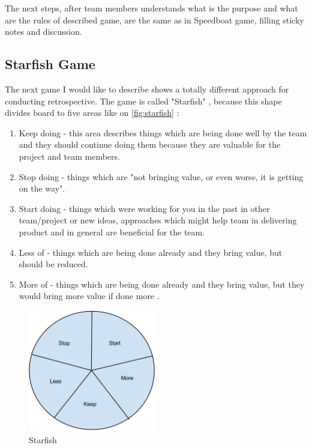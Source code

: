 The next steps, after team members understands what is the purpose and what are the rules of described game, are the same as in Speedboat game, filling sticky notes and discussion.

\subsection{Starfish Game}
\label{subch:starfishGame}
The next game I would like to describe shows a totally different approach for conducting retrospective. The game is called "Starfish" \cite{StarfishBibliography}, because this shape divides board to five areas like on \autoref{fig:starfish} :
\begin{enumerate}
    \item Keep doing - this area describes things which are being done well by the team and they should continue doing them because they are valuable for the project and team members.
    \item Stop doing - things which are "not bringing value, or even worse, it is getting on the way"\cite{StarfishBibliography}.
    \item Start doing - things which were working for you in the past in other team/project or new ideas, approaches which might help team in delivering product and in general are beneficial for the team.
    \item Less of - things which are being done already and they bring value, but should be reduced.
    \item More of - things which are being done already and they bring value, but they would bring more value if done more \cite{StarfishBibliography}.
\end{enumerate}

\begin{figure}[h]
\caption{Starfish}
\label{fig:starfish}
\centering
\includegraphics[width=0.5\textwidth]{img/starfish}
\end{figure}


